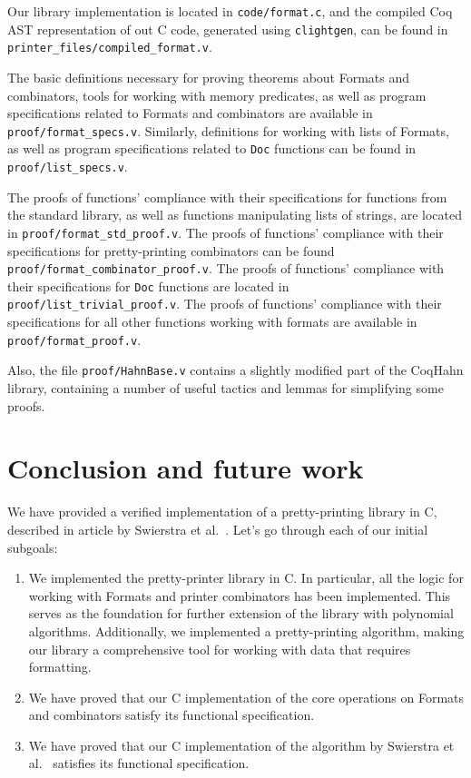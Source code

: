 \documentclass[14pt]{constructor-diploma}
\begin{document}
Our library implementation is located in \texttt{code/format.c}, and the compiled Coq AST representation of out C code, generated using \texttt{clightgen},
 can be found in \texttt{printer\_files/compiled\_format.v}.

The basic definitions necessary for proving theorems about Formats and combinators, tools for working with memory predicates, 
as well as program specifications related to Formats and combinators are available in \texttt{proof/format\_specs.v}.
Similarly, definitions for working with lists of Formats, as well as program specifications related to \texttt{Doc} functions can be found in \texttt{proof/list\_specs.v}.

The proofs of functions' compliance with their specifications for functions from the standard library, as well as functions manipulating lists of strings, are located in \texttt{proof/format\_std\_proof.v}.
The proofs of functions' compliance with their specifications for pretty-printing combinators can be found \texttt{proof/format\_combinator\_proof.v}.
The proofs of functions' compliance with their specifications for \texttt{Doc} functions are located in \texttt{proof/list\_trivial\_proof.v}.
The proofs of functions' compliance with their specifications for all other functions working with formats are available in \texttt{proof/format\_proof.v}.

Also, the file \texttt{proof/HahnBase.v} contains a slightly modified part of the CoqHahn library, containing a number of useful tactics and lemmas for simplifying some proofs.

\section*{Conclusion and future work}
We have provided a verified implementation of a pretty-printing library in C, described in article by 
Swierstra et al.~\cite{swierstra}. Let's go through each of our initial subgoals:
\begin{enumerate}
  \item We implemented the pretty-printer library in C. 
  In particular, all the logic for working with Formats and printer combinators has been implemented. 
  This serves as the foundation for further extension of the library with polynomial algorithms.
  Additionally, we implemented a pretty-printing algorithm, making our library a comprehensive tool for working with data that requires formatting.
  \item We have proved that our C implementation of the core operations on Formats and combinators
  satisfy its functional specification.
  \item We have proved that our C implementation of the algorithm by Swierstra et al.~\cite{swierstra}
  satisfies its functional specification.
\end{enumerate}
\end{document}
